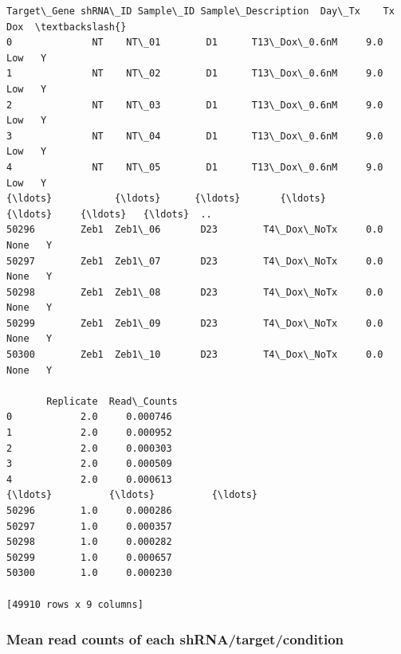 \documentclass[11pt]{article}
\begin{document}
    
    \begin{Verbatim}[commandchars=\\\{\}]
      Target\_Gene shRNA\_ID Sample\_ID Sample\_Description  Day\_Tx    Tx Dox  \textbackslash{}
0              NT    NT\_01        D1      T13\_Dox\_0.6nM     9.0   Low   Y   
1              NT    NT\_02        D1      T13\_Dox\_0.6nM     9.0   Low   Y   
2              NT    NT\_03        D1      T13\_Dox\_0.6nM     9.0   Low   Y   
3              NT    NT\_04        D1      T13\_Dox\_0.6nM     9.0   Low   Y   
4              NT    NT\_05        D1      T13\_Dox\_0.6nM     9.0   Low   Y   
{\ldots}           {\ldots}      {\ldots}       {\ldots}                {\ldots}     {\ldots}   {\ldots}  ..   
50296        Zeb1  Zeb1\_06       D23        T4\_Dox\_NoTx     0.0  None   Y   
50297        Zeb1  Zeb1\_07       D23        T4\_Dox\_NoTx     0.0  None   Y   
50298        Zeb1  Zeb1\_08       D23        T4\_Dox\_NoTx     0.0  None   Y   
50299        Zeb1  Zeb1\_09       D23        T4\_Dox\_NoTx     0.0  None   Y   
50300        Zeb1  Zeb1\_10       D23        T4\_Dox\_NoTx     0.0  None   Y   

       Replicate  Read\_Counts  
0            2.0     0.000746  
1            2.0     0.000952  
2            2.0     0.000303  
3            2.0     0.000509  
4            2.0     0.000613  
{\ldots}          {\ldots}          {\ldots}  
50296        1.0     0.000286  
50297        1.0     0.000357  
50298        1.0     0.000282  
50299        1.0     0.000657  
50300        1.0     0.000230  

[49910 rows x 9 columns]
    \end{Verbatim}

    
    \subsubsection{Mean read counts of each
shRNA/target/condition}\label{mean-read-counts-of-each-shrnatargetcondition}
\end{document}
